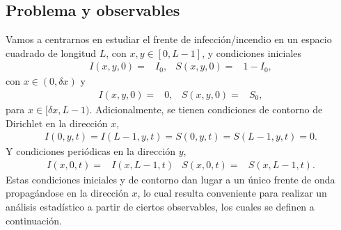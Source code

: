 \subsection{Problema y observables}
\label{Problema}

Vamos a centrarnos en estudiar el frente de infección/incendio en un espacio cuadrado de longitud $L$, 
con $x,y \in [0,L-1]$, y condiciones iniciales
\begin{align*}
  I(x,y,0)=&I_0, & S(x,y,0)=&1-I_0,
\end{align*}
con $x\in(0,\delta x)$ y 
\begin{align*}
  I(x,y,0)=&0, & S(x,y,0)=&S_0,
\end{align*}
para $x\in[\delta x,L-1)$. Adicionalmente, se tienen condiciones de contorno de Dirichlet en la dirección $x$,
\begin{align*}
  I(0,y,t)=I(L-1,y,t)=S(0,y,t)=S(L-1,y,t)=0. 
\end{align*}
Y condiciones periódicas en la dirección $y$, 
\begin{align*}
  I(x,0,t)=&I(x,L-1,t) & S(x,0,t)=&S(x,L-1,t). 
\end{align*}
Estas condiciones iniciales y de contorno dan lugar a un único frente de onda propagándose en la dirección $x$, lo cual resulta conveniente para realizar un análisis 
estadístico a partir de ciertos observables, los cuales se definen a continuación.

